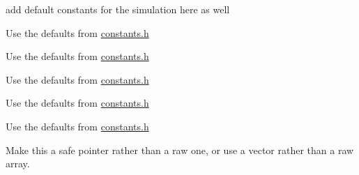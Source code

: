 
\begin{DoxyRefList}
\item[\label{todo__todo000001}%
\Hypertarget{todo__todo000001}%
File \mbox{\hyperlink{constants_8h}{constants.h}} ]add default constants for the simulation here as well  
\item[\label{todo__todo000005}%
\Hypertarget{todo__todo000005}%
Member \mbox{\hyperlink{classrcombinator_1_1F81Model_a6efce55b280e00a48471632574fe7944}{rcombinator\+:\+:F81\+Model\+:\+:F81\+Model}} (double pi\+\_\+T=0.\+25, double pi\+\_\+C=0.\+25, double pi\+\_\+A=0.\+25, double pi\+\_\+G=0.\+25, double scale=0.\+25)]Use the defaults from \mbox{\hyperlink{constants_8h}{constants.\+h}}  
\item[\label{todo__todo000002}%
\Hypertarget{todo__todo000002}%
Member \mbox{\hyperlink{classrcombinator_1_1GTRModel_a0493ce5888bbaf6f0c856493b273a6ef}{rcombinator\+:\+:G\+T\+R\+Model\+:\+:G\+T\+R\+Model}} (double pi\+\_\+T=0.\+25, double pi\+\_\+C=0.\+25, double pi\+\_\+A=0.\+25, double pi\+\_\+G=0.\+25, double T2C=0.\+1, double T2A=0.\+1, double T2G=0.\+1, double C2A=0.\+1, double C2G=0.\+1, double A2G=0.\+1, double scale=0.\+25)]Use the defaults from \mbox{\hyperlink{constants_8h}{constants.\+h}}  
\item[\label{todo__todo000004}%
\Hypertarget{todo__todo000004}%
Member \mbox{\hyperlink{classrcombinator_1_1HKY85Model_aba3aea50215010285dd40b4093bf55c1}{rcombinator\+:\+:H\+K\+Y85\+Model\+:\+:H\+K\+Y85\+Model}} (double pi\+\_\+T=0.\+25, double pi\+\_\+C=0.\+25, double pi\+\_\+A=0.\+25, double pi\+\_\+G=0.\+25, double k=0.\+1, double scale=0.\+25)]Use the defaults from \mbox{\hyperlink{constants_8h}{constants.\+h}}  
\item[\label{todo__todo000007}%
\Hypertarget{todo__todo000007}%
Member \mbox{\hyperlink{classrcombinator_1_1JC69Model_a979834f85de8b2bb92d0cce5e64d6346}{rcombinator\+:\+:J\+C69\+Model\+:\+:J\+C69\+Model}} (double scale=0.\+25)]Use the defaults from \mbox{\hyperlink{constants_8h}{constants.\+h}}  
\item[\label{todo__todo000006}%
\Hypertarget{todo__todo000006}%
Member \mbox{\hyperlink{classrcombinator_1_1K80Model_a73baeeb9bbddfcd006e4642f28c95411}{rcombinator\+:\+:K80\+Model\+:\+:K80\+Model}} (double k=1, double scale=0.\+25)]Use the defaults from \mbox{\hyperlink{constants_8h}{constants.\+h}}  
\item[\label{todo__todo000008}%
\Hypertarget{todo__todo000008}%
Member \mbox{\hyperlink{classrcombinator_1_1RandMaths_afbc0d35bd9744ecab1983914ac32d68c}{rcombinator\+:\+:Rand\+Maths\+:\+:choose\+\_\+event}} (double $\ast$events, long num\+\_\+events)]Make this a safe pointer rather than a raw one, or use a vector rather than a raw array.


\end{DoxyRefList}
